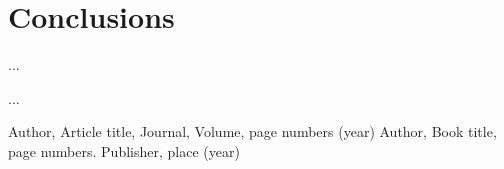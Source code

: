 \section{Conclusions}
\label{conc}

...



\begin{acknowledgements}
...
\end{acknowledgements}




\begin{thebibliography}{}
%
%
Author, Article title, Journal, Volume, page numbers (year)
Author, Book title, page numbers. Publisher, place (year)
\end{thebibliography}



